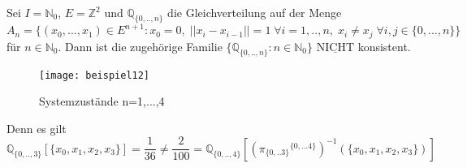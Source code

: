 Sei $I = \mathbb{N}_{0}$, $E = \mathbb{Z}^{2}$ und $\mathbb{Q}_{\lbrace 0,..,n \rbrace}$ die Gleichverteilung auf der Menge
\begin{equation*}
A_{n} = \lbrace (x_{0},...,x_{1}) \in E^{n+1} : x_{0} = 0, \; ||{x_{i} - x_{i-1}}|| = 1  \; \forall i = 1,..,n,\; x_{i} \neq x_{j} \; \forall i,j \in \lbrace 0,...,n \rbrace \rbrace
\end{equation*}
für $n \in \mathbb{N}_{0}$. Dann ist die zugehörige Familie $\lbrace \mathbb{Q}_{\lbrace 0,..,n \rbrace} : n \in \mathbb{N}_{0} \rbrace$ $\underline{\mathrm{NICHT}}$ konsistent.
\begin{figure}[H]
\texttt{[image: beispiel12]}
\caption{Systemzustände n=1,...,4}
\end{figure}

Denn es gilt
\begin{equation*}
\mathbb{Q}_{\lbrace 0,..,3 \rbrace}[\lbrace x_{0},x_{1},x_{2},x_{3} \rbrace] = \dfrac{1}{36} \neq \dfrac{2}{100} = \mathbb{Q}_{\lbrace 0,..,4 \rbrace}[{({\pi_{\lbrace 0,..3 \rbrace}}^{ \lbrace 0,...4 \rbrace})}^{-1}(\lbrace x_{0},x_{1},x_{2},x_{3} \rbrace)]
\end{equation*}